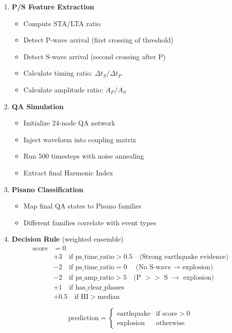 \documentclass[11pt]{article}
\theoremstyle{remark}
\begin{document}
\begin{enumerate}
\item \textbf{P/S Feature Extraction}
\begin{itemize}
\item Compute STA/LTA ratio
\item Detect P-wave arrival (first crossing of threshold)
\item Detect S-wave arrival (second crossing after P)
\item Calculate timing ratio: $\Delta t_S / \Delta t_P$
\item Calculate amplitude ratio: $A_P / A_S$
\end{itemize}

\item \textbf{QA Simulation}
\begin{itemize}
\item Initialize 24-node QA network
\item Inject waveform into coupling matrix
\item Run 500 timesteps with noise annealing
\item Extract final Harmonic Index
\end{itemize}

\item \textbf{Pisano Classification}
\begin{itemize}
\item Map final QA states to Pisano families
\item Different families correlate with event types
\end{itemize}

\item \textbf{Decision Rule} (weighted ensemble)
\begin{align}
\text{score} &= 0 \nonumber \\
&+ 3 \quad \text{if } \text{ps\_time\_ratio} > 0.5 \quad \text{(Strong earthquake evidence)} \nonumber \\
&- 2 \quad \text{if } \text{ps\_time\_ratio} = 0 \quad \text{(No S-wave $\to$ explosion)} \nonumber \\
&- 2 \quad \text{if } \text{ps\_amp\_ratio} > 5 \quad \text{(P $>>$ S $\to$ explosion)} \nonumber \\
&+ 1 \quad \text{if } \text{has\_clear\_phases} \nonumber \\
&+ 0.5 \quad \text{if } \text{HI} > \text{median} \nonumber
\end{align}

\begin{equation}
\text{prediction} = \begin{cases}
\text{earthquake} & \text{if score} > 0 \\
\text{explosion} & \text{otherwise}
\end{cases}
\end{equation}
\end{enumerate}
\end{document}
